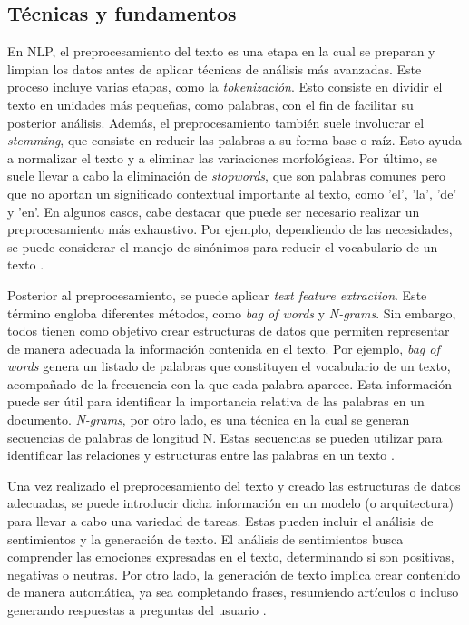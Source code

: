 \subsection{Técnicas y fundamentos}

En NLP, el preprocesamiento del texto es una etapa en la cual se preparan y limpian los datos antes de aplicar técnicas de análisis más avanzadas. Este proceso incluye varias etapas, como la \textit{tokenización}. Esto consiste en dividir el texto en unidades más pequeñas, como palabras, con el fin de facilitar su posterior análisis. Además, el preprocesamiento también suele involucrar el \textit{stemming}, que consiste en reducir las palabras a su forma base o raíz. Esto ayuda a normalizar el texto y a eliminar las variaciones morfológicas. Por último, se suele llevar a cabo la eliminación de \textit{stopwords}, que son palabras comunes pero que no aportan un significado contextual importante al texto, como 'el', 'la', 'de' y 'en'. En algunos casos, cabe destacar que puede ser necesario realizar un preprocesamiento más exhaustivo. Por ejemplo, dependiendo de las necesidades, se puede considerar el manejo de sinónimos para reducir el vocabulario de un texto \cite{sixteen}.

Posterior al preprocesamiento, se puede aplicar \textit{text feature extraction}. Este término engloba diferentes métodos, como \textit{bag of words} y \textit{N-grams}. Sin embargo, todos tienen como objetivo crear estructuras de datos que permiten representar de manera adecuada la información contenida en el texto. Por ejemplo, \textit{bag of words} genera un listado de palabras que constituyen el vocabulario de un texto, acompañado de la frecuencia con la que cada palabra aparece. Esta información puede ser útil para identificar la importancia relativa de las palabras en un documento. \textit{N-grams}, por otro lado, es una técnica en la cual se generan secuencias de palabras de longitud N. Estas secuencias se pueden utilizar para identificar las relaciones y estructuras entre las palabras en un texto \cite{sixteen}.

Una vez realizado el preprocesamiento del texto y creado las estructuras de datos adecuadas, se puede introducir dicha información en un modelo (o arquitectura) para llevar a cabo una variedad de tareas. Estas pueden incluir el análisis de sentimientos y la generación de texto. El análisis de sentimientos busca comprender las emociones expresadas en el texto, determinando si son positivas, negativas o neutras. Por otro lado, la generación de texto implica crear contenido de manera automática, ya sea completando frases, resumiendo artículos o incluso generando respuestas a preguntas del usuario \cite{seventeen}.


